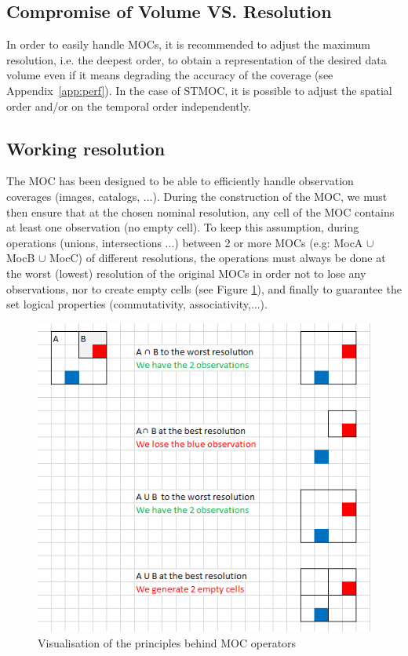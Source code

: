 \documentclass[11pt,a4paper]{ivoa}
\begin{document}
\subsection{Compromise of Volume VS. Resolution}
In order to easily handle MOCs, it is recommended to adjust
the maximum resolution, i.e. the deepest order, to obtain a representation of
the desired data volume even if it means degrading the accuracy of the coverage
(see Appendix~\ref{app:perf}). In the case of STMOC, it is possible to adjust
the spatial order and/or on the temporal order independently.

\subsection{Working resolution}
The MOC has been designed to be able to efficiently handle observation
coverages (images, catalogs, ...). During the construction of the
MOC, we must then ensure that at the chosen nominal resolution, any cell
of the MOC contains at least one observation (no empty cell). To keep
this assumption, during operations (unions, intersections ...)
between 2 or more MOCs (e.g: MocA $\cup$ MocB $\cup$ MocC) of different
resolutions, the operations
must always be done at the worst (lowest) resolution of the original MOCs
in order not to lose any observations, nor to create empty cells (see
Figure \ref{fig:operation}), and finally to guarantee the set logical
properties (commutativity, associativity,...).

\begin{figure}[!htbp]
\begin{center}
\includegraphics[scale=.5]{operation.png}
\end{center}
\caption[Visualisation of MOC operations]{Visualisation of the
  principles behind MOC operators}
\label{fig:operation}
\end{figure}
\end{document}
